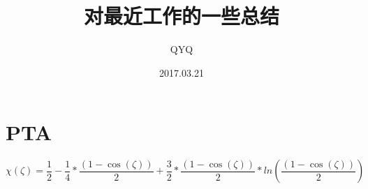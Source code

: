 \documentclass[UTF8]{ctexart}
\begin{document}
\title{对最近工作的一些总结}
\author{QYQ}
\date{2017.03.21}
\maketitle
{}
\section{PTA}
\begin{equation}
	\chi(\zeta)=\frac{1}{2}-\frac{1}{4}*\frac{(1-\cos(\zeta))}{2}+\frac{3}{2}*\frac{(1-\cos(\zeta))}{2}*ln(\frac{(1-\cos(\zeta))}{2})
\end{equation}
\end{document}
